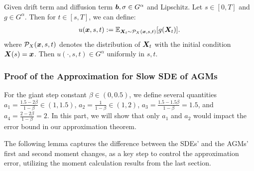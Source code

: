 \begin{lemma}\label{lmm:uniform-u}
    Given drift term and diffusion term ${\bm{b}},\mathbf{\sigma}\in G^{\alpha}$ and Lipschitz. Let $s\in [0,T]$ and $g\in G^{\alpha}$. Then for $t \in [s, T]$, we can define:
    \begin{align*}
        u({\bm{x}},s,t):=\mathbb{E}_{{\bm{X}}_t \sim \mathcal{P}_{X}({\bm{x}},s,t)}[g({\bm{X}}_t)].
    \end{align*}
    where $\mathcal{P}_{X}({\bm{x}},s,t)$ denotes the distribution of ${\bm{X}}_t$ with the initial condition ${\bm{X}}(s) = {\bm{x}}$. Then $u(\cdot,s,t)\in G^{\alpha}$ uniformly in $s,t$.
\end{lemma}

\subsubsection{Proof of the Approximation for Slow SDE of AGMs}
For the giant step constant $\beta\in (0,0.5)$, we define several quantities $a_1 = \frac{1.5 -2 \beta}{1-\beta}\in(1,1.5)$, $a_2 = \frac{1}{1-\beta}\in(1,2)$, $a_3 = \frac{1.5 -1.5 \beta}{1-\beta}=1.5$, and $a_4= \frac{2-2\beta}{1-\beta} =2$. In this part, we will show that only $a_1$ and $a_2$ would impact the error bound in our approximation theorem. 

The following lemma captures the difference between the SDEs' and the AGMs' first and second moment changes, as a key step to control the approximation error, utilizing the moment calculation results from the last section.

